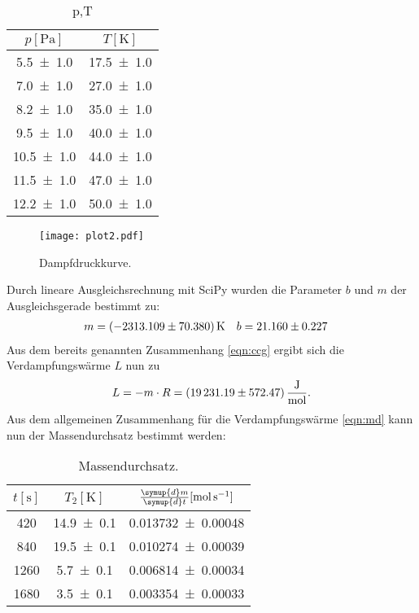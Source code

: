 \begin{table}
  \centering
  \caption{p,T}
  \label{tab:tabelle3}
\begin{tabular}{c c}
  \toprule
  {$p [\si{\pascal}]$} & {$T [\si{\kelvin}]$}\\
  \midrule
  \num{5.5 +- 1.0}  & \num{17.5 +- 1.0} \\
  \num{7.0 +- 1.0}  & \num{27.0 +- 1.0} \\
  \num{8.2 +- 1.0}  & \num{35.0 +- 1.0} \\
  \num{9.5 +- 1.0}  & \num{40.0 +- 1.0} \\
  \num{10.5 +- 1.0} & \num{44.0 +- 1.0} \\
  \num{11.5 +- 1.0} & \num{47.0 +- 1.0} \\
  \num{12.2 +- 1.0} & \num{50.0 +- 1.0} \\
  \bottomrule
\end{tabular}
\end{table}

\begin{figure}[H]
  \centering
  \texttt{[image: plot2.pdf]}
  \caption{Dampfdruckkurve.}
  \label{fig:plot2}
\end{figure}
Durch lineare Ausgleichsrechnung mit SciPy wurden die Parameter $b$ und $m$ der Ausgleichsgerade bestimmt zu:
\begin{align*}
m &= \SI{-2313.109 +- 70.380}{\kelvin} & b &= \num{21.160 +- 0.227}
\end{align*}
Aus dem bereits genannten Zusammenhang \eqref{eqn:ccg} ergibt sich die Verdampfungswärme $L$ nun zu
\begin{align*}
  L = -m \cdot R = \SI[per-mode=fraction]{19231.19 +- 572.47}{\joule\per\mol}.
\end{align*}
Aus dem allgemeinen Zusammenhang für die Verdampfungswärme \eqref{eqn:md} kann nun der Massendurchsatz bestimmt werden:

\begin{table}
  \centering
  \caption{Massendurchsatz.}
  \label{tab:tabelle4}
\begin{tabular}{c c c}
  \toprule
  {$t [\si{\second}]$} & {$T_2 [\si{\kelvin}]$} & {$\frac{\symup{d} m}{\symup{d} t} [\si{\mol\per\second}]$}\\
  \midrule
  \num{420} & \num{14.9 +- 0.1} & \num{0.013732 +- 0.00048} \\
  \num{840} & \num{19.5 +- 0.1} & \num{0.010274 +- 0.00039}\\
  \num{1260} & \num{5.7 +- 0.1} & \num{0.006814 +- 0.00034}  \\
  \num{1680} & \num{3.5 +- 0.1} & \num{0.003354 +- 0.00033} \\
  \bottomrule
\end{tabular}
\end{table}
